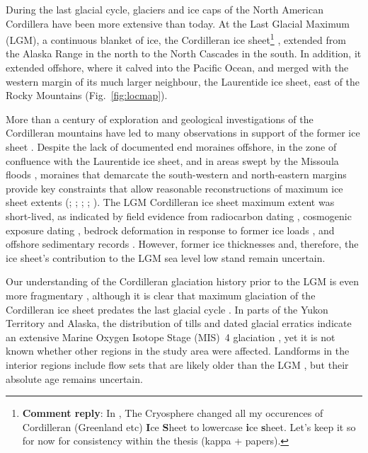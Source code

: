 \documentclass[tc, manuscript]{copernicus}
\newcommand{\renote}[1]{\footnote{\textbf{Comment reply}: #1}}
\begin{document}
\introduction
\label{sec:intro}

During the last glacial cycle, glaciers and ice caps of the North American
Cordillera have been more extensive than today. At the Last Glacial
Maximum (LGM), a continuous blanket of ice, the Cordilleran ice sheet\renote{
    In \citep{Seguinot.etal.2014}, The Cryosphere changed all my occurences of
    Cordilleran (Greenland etc) \textbf{I}ce \textbf{S}heet to lowercase
    \textbf{i}ce \textbf{s}heet. Let's keep it so for now for consistency
    within the thesis (kappa + papers).}
\citep{Dawson.1888}, extended from the Alaska Range in the north to the
North Cascades in the south. In addition, it extended offshore, where it calved
into the Pacific Ocean, and merged with the western margin of its much larger
neighbour, the Laurentide ice sheet, east of the Rocky Mountains
(Fig.~\ref{fig:locmap}).

More than a century of exploration and geological investigations of the
Cordilleran mountains have led to many observations in support of the former
ice sheet
    \citep{Jackson.Clague.1991}.
Despite the lack of documented end moraines offshore, in the zone of confluence
with the Laurentide ice sheet, and in areas swept by the Missoula floods
    \citep{Carrara.etal.1996},
moraines that demarcate the south-western and north-eastern margins provide key
constraints that allow reasonable reconstructions of maximum ice sheet extents
    (\citealp{Prest.etal.1968}; \citealp[Fig. 1.12]{Clague.1989};
     \citealp{Duk-Rodkin.1999};
     \citealp{Booth.etal.2003}; \citealp{Dyke.2004}).
The LGM Cordilleran ice sheet maximum extent was short-lived, as indicated by
field evidence from radiocarbon dating
    \citep{Clague.etal.1980, Clague.1985, Clague.1986, Porter.Swanson.1998,
           Menounos.etal.2008},
cosmogenic exposure dating
    \citep{Stroeven.etal.2010, Stroeven.etal.2014, Margold.etal.2014},
bedrock deformation in response to former ice loads
    \citep{Clague.James.2002, Clague.etal.2005},
and offshore sedimentary records
    \citep{Cosma.etal.2008, Davies.etal.2011}.
However, former ice thicknesses and, therefore, the ice sheet's contribution to
the LGM sea level low stand
    \citep{Carlson.Clark.2012, Clark.Mix.2002}
remain uncertain.

Our understanding of the Cordilleran glaciation history prior to the LGM is
even more fragmentary
    \citep{Barendregt.Irving.1998, Kleman.etal.2010, Rutter.etal.2012},
although it is clear that maximum glaciation of the Cordilleran ice sheet
predates the last glacial cycle
    \citep{Hidy.etal.2013}.
In parts of the Yukon Territory and Alaska, the distribution of tills
    \citep{Turner.etal.2013}
and dated glacial erratics indicate an extensive Marine Oxygen Isotope Stage
(MIS)~4 glaciation
    \citep{Ward.etal.2007, Ward.etal.2008, Briner.Kaufman.2008,
           Stroeven.etal.2010, Stroeven.etal.2014},
yet it is not known whether other regions in the study area were affected.
Landforms in the interior regions include flow sets that are likely
older than the LGM
    \citep[Fig.~2]{Kleman.etal.2010},
but their absolute age remains uncertain.
\end{document}
